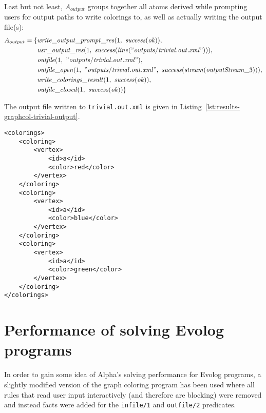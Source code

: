 \begin{example}
Last but not least, $A_{output}$ groups together all atoms derived while prompting users for output paths to write colorings to, as well as actually writing the output file(s):
\begin{align*}
    A_{output} = \{&\mathit{write\_output\_prompt\_res}(1,~\mathit{success}(\mathit{ok})),\\
                   &\mathit{usr\_output\_res}(1,~\mathit{success}(\mathit{line}(\mathit{"outputs/trivial.out.xml"}))),\\
                   &\mathit{outfile}(1,~\mathit{"outputs/trivial.out.xml"}),\\
                   &\mathit{outfile\_open}(1,~\mathit{"outputs/trivial.out.xml"},~\mathit{success}(\mathit{stream}(\mathit{outputStream}\_3))),\\
                   &\mathit{write\_colorings\_result}(1,~\mathit{success}(\mathit{ok})),\\
                   &\mathit{outfile\_closed}(1,~\mathit{success}(\mathit{ok}))\}
\end{align*}

\newpage

The output file written to \texttt{trivial.out.xml} is given in Listing~\ref{lst:results-graphcol-trivial-output}.

\begin{lstlisting}[style=asp-code, label={lst:results-graphcol-trivial-output}, caption={XML encoding of caluclated colorings for the input file from Listing~\ref{lst:results-graphcol-trivial-input}}]
<colorings>
	<coloring>
		<vertex>
			<id>a</id>
			<color>red</color>
		</vertex>
	</coloring>
	<coloring>
		<vertex>
			<id>a</id>
			<color>blue</color>
		</vertex>
	</coloring>
	<coloring>
		<vertex>
			<id>a</id>
			<color>green</color>
		</vertex>
	</coloring>
</colorings>    
\end{lstlisting}
\end{example}
 

\section{Performance of solving Evolog programs}
\label{sec:results-performance-tests}

In order to gain some idea of Alpha's solving performance for Evolog programs, a slightly modified version of the graph coloring program has been used where all rules that read user input interactively (and therefore are blocking) were removed and instead facts were added for the \texttt{infile/1} and \texttt{outfile/2} predicates.

